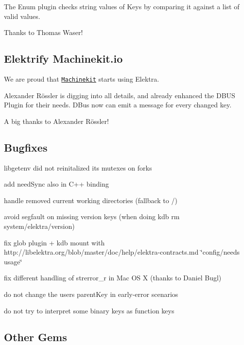 The Enum plugin checks string values of Keys by comparing it against a list of valid values.

Thanks to Thomas Waser!

\subsection*{Elektrify Machinekit.\+io}

We are proud that \href{http://www.machinekit.io/}{\tt Machinekit} starts using Elektra.

Alexander Rössler is digging into all details, and already enhanced the D\+B\+U\+S Plugin for their needs. D\+Bus now can emit a message for every changed key.

A big thanks to Alexander Rössler!

\subsection*{Bugfixes}


\begin{DoxyItemize}
\item libgetenv did not reinitalized its mutexes on forks
\item add need\+Sync also in C++ binding
\item handle removed current working directories (fallback to /)
\item avoid segfault on missing version keys (when doing {\ttfamily kdb rm system/elektra/version})
\item fix glob plugin + kdb mount with http\+://libelektra.org/blob/master/doc/help/elektra-\/contracts.\+md \char`\"{}config/needs usage\char`\"{}
\item fix different handling of strerror\+\_\+r in Mac O\+S X (thanks to Daniel Bugl)
\item do not change the users parent\+Key in early-\/error scenarios
\item do not try to interpret some binary keys as function keys
\end{DoxyItemize}

\subsection*{Other Gems}


